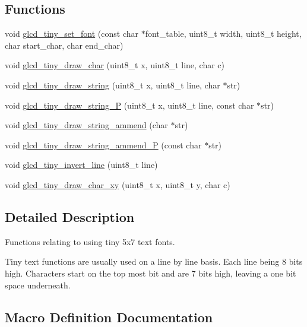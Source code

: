 \subsection*{Functions}
\begin{DoxyCompactItemize}
\item 
void \hyperlink{group___tiny_text_ga8df82f7f6d616587f2c5ca55ac9f72fa}{glcd\+\_\+tiny\+\_\+set\+\_\+font} (const char $\ast$font\+\_\+table, uint8\+\_\+t width, uint8\+\_\+t height, char start\+\_\+char, char end\+\_\+char)
\item 
void \hyperlink{group___tiny_text_ga5ba33d2c7a7bd5c397963f0d0dffd628}{glcd\+\_\+tiny\+\_\+draw\+\_\+char} (uint8\+\_\+t x, uint8\+\_\+t line, char c)
\item 
void \hyperlink{group___tiny_text_ga679994954873b92bd139deff9e0bbb26}{glcd\+\_\+tiny\+\_\+draw\+\_\+string} (uint8\+\_\+t x, uint8\+\_\+t line, char $\ast$str)
\item 
void \hyperlink{group___tiny_text_gade30aed750a83809464e75feff501da9}{glcd\+\_\+tiny\+\_\+draw\+\_\+string\+\_\+\+P} (uint8\+\_\+t x, uint8\+\_\+t line, const char $\ast$str)
\item 
void \hyperlink{group___tiny_text_gafc083b51f666e69c1e40e1b90f80797f}{glcd\+\_\+tiny\+\_\+draw\+\_\+string\+\_\+ammend} (char $\ast$str)
\item 
void \hyperlink{group___tiny_text_ga396ad980cf754dc4db4746d7684e3630}{glcd\+\_\+tiny\+\_\+draw\+\_\+string\+\_\+ammend\+\_\+\+P} (const char $\ast$str)
\item 
void \hyperlink{group___tiny_text_gaf76035b880aa7c2a4def39e54c990fd6}{glcd\+\_\+tiny\+\_\+invert\+\_\+line} (uint8\+\_\+t line)
\item 
void \hyperlink{group___tiny_text_ga756fd3e5bc5206a45bc6bda7ecd0356f}{glcd\+\_\+tiny\+\_\+draw\+\_\+char\+\_\+xy} (uint8\+\_\+t x, uint8\+\_\+t y, char c)
\end{DoxyCompactItemize}


\subsection{Detailed Description}
Functions relating to using tiny 5x7 text fonts.

Tiny text functions are usually used on a line by line basis. Each line being 8 bits high. Characters start on the top most bit and are 7 bits high, leaving a one bit space underneath. 

\subsection{Macro Definition Documentation}
\hypertarget{group___tiny_text_ga9ea14415ac02bc0ddb4cd0fc89084a35}{}
